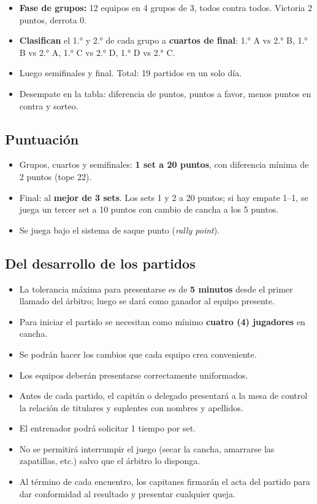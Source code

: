 	\begin{itemize}
		\item \textbf{Fase de grupos:} 12 equipos en 4 grupos de 3, todos contra todos. Victoria 2 puntos, derrota 0.
		\item \textbf{Clasifican} el 1.° y 2.° de cada grupo a \textbf{cuartos de final}: 1.° A vs 2.° B, 1.° B vs 2.° A, 1.° C vs 2.° D, 1.° D vs 2.° C.
		\item Luego semifinales y final. Total: 19 partidos en un solo día.
		\item Desempate en la tabla: diferencia de puntos, puntos a favor, menos puntos en contra y sorteo.
	\end{itemize}

	\subsection{Puntuación}

	\begin{itemize}
		\item Grupos, cuartos y semifinales: \textbf{1 set a 20 puntos}, con diferencia mínima de 2 puntos (tope 22).
		\item Final: al \textbf{mejor de 3 sets}. Los sets 1 y 2 a 20 puntos; si hay empate 1--1, se juega un tercer set a 10 puntos con cambio de cancha a los 5 puntos.
		\item Se juega bajo el sistema de saque punto (\textit{rally point}).
	\end{itemize}

	\subsection{Del desarrollo de los partidos}

	\begin{itemize}
		\item La tolerancia máxima para presentarse es de \textbf{5 minutos} desde el primer llamado del árbitro; luego se dará como ganador al equipo presente.
		\item Para iniciar el partido se necesitan como mínimo \textbf{cuatro (4) jugadores} en cancha.
		\item Se podrán hacer los cambios que cada equipo crea conveniente.
		\item Los equipos deberán presentarse correctamente uniformados.
		\item Antes de cada partido, el capitán o delegado presentará a la mesa de control la relación de titulares y suplentes con nombres y apellidos.
		\item El entrenador podrá solicitar 1 tiempo por set.
		\item No se permitirá interrumpir el juego (secar la cancha, amarrarse las zapatillas, etc.) salvo que el árbitro lo disponga.
		\item Al término de cada encuentro, los capitanes firmarán el acta del partido para dar conformidad al resultado y presentar cualquier queja.
	\end{itemize}

